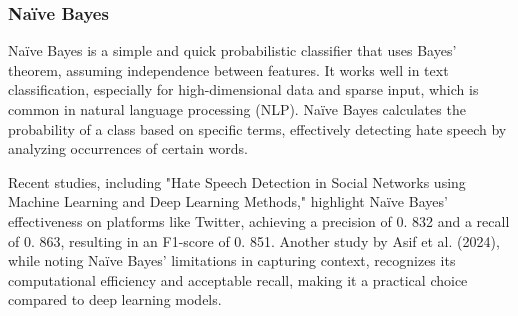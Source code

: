 \subsubsection{Na\"ive Bayes}

\noindent
Naïve Bayes is a simple and quick probabilistic classifier that uses Bayes' theorem, assuming independence between features. It works well in text classification, especially for high-dimensional data and sparse input, which is common in natural language processing (NLP). Naïve Bayes calculates the probability of a class based on specific terms, effectively detecting hate speech by analyzing occurrences of certain words.

Recent studies, including "Hate Speech Detection in Social Networks using Machine Learning and Deep Learning Methods," highlight Naïve Bayes' effectiveness on platforms like Twitter, achieving a precision of 0. 832 and a recall of 0. 863, resulting in an F1-score of 0. 851. Another study by Asif et al. (2024), while noting Naïve Bayes' limitations in capturing context, recognizes its computational efficiency and acceptable recall, making it a practical choice compared to deep learning models.